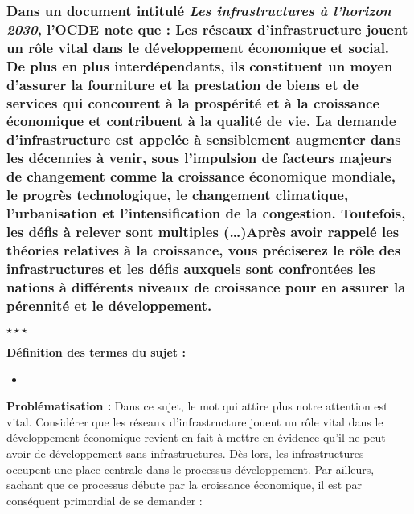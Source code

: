 \newpage %
	\subsubsection*{Dans un document intitulé \guillemetleft \textit{Les infrastructures à l’horizon 2030}\guillemetright,  l’OCDE note que : \newline \guillemetleft Les réseaux d’infrastructure jouent un rôle vital dans le développement économique et social. De plus en plus interdépendants, ils constituent un moyen d’assurer la fourniture et la prestation de biens et de services qui concourent à la prospérité et à la croissance économique et contribuent à la qualité de vie. La demande d’infrastructure est appelée à sensiblement augmenter dans les décennies à venir, sous l’impulsion de facteurs majeurs de changement comme la croissance économique mondiale, le progrès technologique, le changement climatique, l’urbanisation et l’intensification de la congestion. Toutefois, les défis à relever sont multiples (…)\guillemetright \newline \newline Après avoir rappelé les théories relatives à la croissance, vous préciserez le rôle des infrastructures et les défis auxquels sont confrontées les nations à différents niveaux de croissance pour en assurer la pérennité et le développement. }
\begin{center}
	$\star \star \star$
\end{center}
\noindent \textbf{Définition des termes du sujet :}

\begin{itemize}
	\item %
\end{itemize}


\noindent \textbf{Problématisation :} Dans ce sujet, le mot qui attire plus notre attention est \guillemetleft vital\guillemetright. Considérer que les réseaux d'infrastructure jouent un rôle vital dans le développement économique revient en fait à mettre en évidence qu'il ne peut avoir de développement sans infrastructures. Dès lors, les infrastructures occupent une place centrale dans le processus développement. Par ailleurs, sachant que ce processus débute par la croissance économique, il est par conséquent primordial de se demander :

